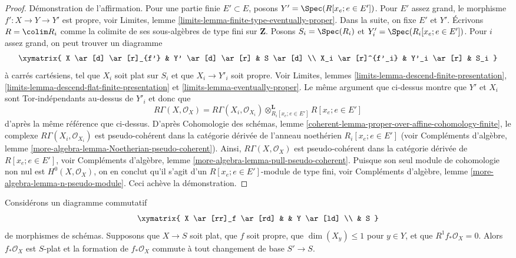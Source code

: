 \begin{proof}
\medskip\noindent
Démonstration de l'affirmation.
Pour une partie finie $E' \subset E$, posons $Y' = \Spec(R[x_e; e \in E'])$.
Pour $E'$ assez grand, le morphisme $f' : X \to Y \to Y'$ est propre, voir
Limites, lemme \ref{limits-lemma-finite-type-eventually-proper}.
Dans la suite, on fixe $E'$ et $Y'$.
Écrivons $R = \colim R_i$ comme la colimite de ses sous-algèbres de type fini
sur $\mathbf{Z}$. Posons $S_i = \Spec(R_i)$
et $Y'_i = \Spec(R_i[x_e; e \in E'])$.
Pour $i$ assez grand, on peut trouver un diagramme
$$
\xymatrix{
X \ar[d] \ar[r]_{f'} & Y' \ar[d] \ar[r] & S \ar[d] \\
X_i \ar[r]^{f'_i} & Y'_i \ar[r] & S_i
}
$$
à carrés cartésiens, tel que $X_i$ soit plat sur $S_i$ et que
$X_i \to Y'_i$ soit propre. Voir
Limites, lemmes \ref{limits-lemma-descend-finite-presentation},
\ref{limits-lemma-descend-flat-finite-presentation} et
\ref{limits-lemma-eventually-proper}.
Le même argument que ci-dessus montre que $Y'$ et $X_i$
sont Tor-indépendants au-dessus de $Y'_i$ et donc que
$$
R\Gamma(X, \mathcal{O}_X) =
R\Gamma(X_i, \mathcal{O}_{X_i})
\otimes^\mathbf{L}_{R_i[x_e; e \in E']}
R[x_e; e \in E']
$$
d'après la même référence que ci-dessus. D'après Cohomologie des schémas, lemme
\ref{coherent-lemma-proper-over-affine-cohomology-finite},
le complexe $R\Gamma(X_i, \mathcal{O}_{X_i})$ est pseudo-cohérent
dans la catégorie dérivée de l'anneau noethérien $R_i[x_e; e \in E']$ (voir
Compléments d'algèbre, lemme \ref{more-algebra-lemma-Noetherian-pseudo-coherent}).
Ainsi, $R\Gamma(X, \mathcal{O}_X)$ est pseudo-cohérent dans la catégorie dérivée
de $R[x_e; e \in E']$, voir
Compléments d'algèbre, lemme \ref{more-algebra-lemma-pull-pseudo-coherent}.
Puisque son seul module de cohomologie non nul
est $H^0(X, \mathcal{O}_X)$, on en conclut qu'il s'agit d'un
$R[x_e; e \in E']$-module de type fini, voir
Compléments d'algèbre, lemme \ref{more-algebra-lemma-n-pseudo-module}.
Ceci achève la démonstration.
\end{proof}

\begin{lemma}
\label{lemma-h1-fibre-zero-h0-flat}
Considérons un diagramme commutatif
$$
\xymatrix{
X \ar[rr]_f \ar[rd] & & Y \ar[ld] \\
& S
}
$$
de morphismes de schémas. Supposons que $X \to S$
soit plat, que $f$ soit propre, que $\dim(X_y) \leq 1$ pour $y \in Y$, et que
$R^1f_*\mathcal{O}_X = 0$. Alors $f_*\mathcal{O}_X$
est $S$-plat et la formation de $f_*\mathcal{O}_X$ commute
à tout changement de base $S' \to S$.
\end{lemma}

